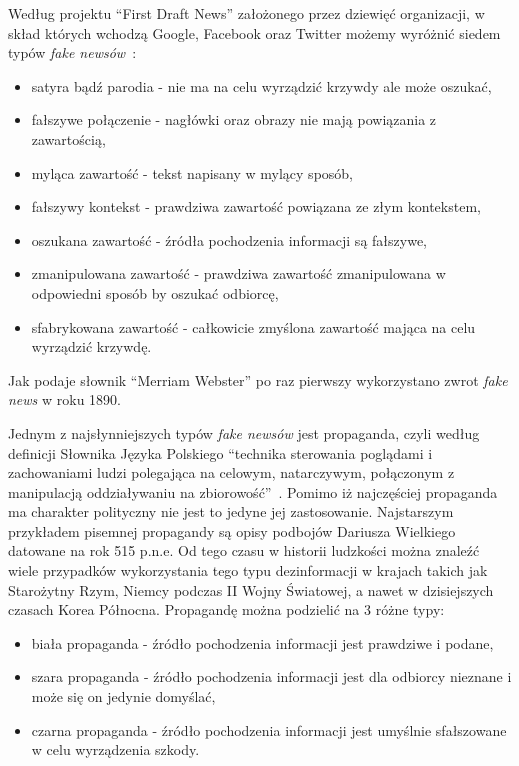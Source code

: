 Według projektu ``First Draft News'' założonego przez dziewięć organizacji, 
w skład których wchodzą Google, Facebook oraz Twitter 
możemy wyróżnić siedem typów \textit{fake newsów}~\cite{TypesOfFakeNews}:
\begin{itemize}
    \item satyra bądź parodia - nie ma na celu wyrządzić krzywdy ale może oszukać,
    \item fałszywe połączenie - nagłówki oraz obrazy nie mają powiązania z zawartością,
    \item myląca zawartość - tekst napisany w mylący sposób,
    \item fałszywy kontekst - prawdziwa zawartość powiązana ze złym kontekstem,
    \item oszukana zawartość - źródła pochodzenia informacji są fałszywe,
    \item zmanipulowana zawartość - prawdziwa zawartość zmanipulowana w odpowiedni sposób by oszukać odbiorcę,
    \item sfabrykowana zawartość - całkowicie zmyślona zawartość mająca na celu wyrządzić krzywdę.
\end{itemize}
Jak podaje słownik ``Merriam Webster'' po raz pierwszy wykorzystano zwrot
\textit{fake news} w roku 1890.


Jednym z najsłynniejszych typów \textit{fake newsów} jest propaganda, czyli według 
definicji Słownika Języka Polskiego ``technika sterowania poglądami i zachowaniami ludzi polegająca na 
celowym, natarczywym, połączonym z manipulacją oddziaływaniu na zbiorowość''~\cite{SJP}.
Pomimo iż najczęściej propaganda ma charakter polityczny nie jest to jedyne 
jej zastosowanie. Najstarszym przykładem pisemnej propagandy są opisy podbojów
Dariusza Wielkiego datowane na rok 515 p.n.e. Od tego czasu w historii ludzkości
można znaleźć wiele przypadków wykorzystania tego typu dezinformacji w krajach takich
jak Starożytny Rzym, Niemcy podczas II Wojny Światowej, a nawet w dzisiejszych 
czasach Korea Północna.
Propagandę można podzielić na 3 różne typy:
\begin{itemize}
    \item biała propaganda - źródło pochodzenia informacji jest prawdziwe i podane,
    \item szara propaganda - źródło pochodzenia informacji jest dla odbiorcy nieznane i może się on jedynie domyślać,
    \item czarna propaganda - źródło pochodzenia informacji jest umyślnie sfałszowane w celu wyrządzenia szkody.
\end{itemize}


